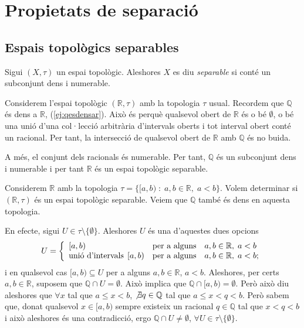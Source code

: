 \documentclass[../main.tex]{subfiles}
\begin{document}
\chapter{Propietats de separació}
\section{Espais topològics separables}

\begin{defi}
\label{def:espaitopologicseparable} Sigui $(X,\tau)$ un espai topològic. Aleshores $X$ es diu \textit{separable} si conté un subconjunt dens i numerable.
\end{defi}

\begin{ej}
\label{ej:separable1} Considerem l'espai topològic $(\mathbb{R},\tau)$ amb la topologia $\tau$ usual. Recordem que $\mathbb{Q}$ és dens a $\mathbb{R}$, (\ref{ej:qesdensar}). Això és perquè qualsevol obert de $\mathbb{R}$ és o bé $\emptyset$, o bé una unió d'una col·lecció arbitrària d'intervals oberts i tot interval obert conté un racional. Per tant, la intersecció de qualsevol obert de $\mathbb{R}$ amb $\mathbb{Q}$ és no buida.

A més, el conjunt dels racionals és numerable. Per tant, $\mathbb{Q}$ és un subconjunt dens i numerable i per tant $\mathbb{R}$ és un espai topològic separable.
\end{ej}

\begin{ej}
\label{ej:separable1} Considerem $\mathbb{R}$ amb la topologia $\tau = \{[a,b)\;:\;a,b\in\mathbb{R},\;a<b\}$. Volem determinar si $(\mathbb{R},\tau)$ és un espai topològic separable. Veiem que $\mathbb{Q}$ també és dens en aquesta topologia.

En efecte, sigui $U\in\tau\setminus\{\emptyset\}$. Aleshores $U$ és una d'aquestes dues opcions
\begin{equation}
    \notag
    U = \left\{
    \begin{array}{lcl}
        \left[a,b\right) & \text{per a alguns} & a,b\in\mathbb{R},\;a<b \\
        \text{unió d'intervals}\;\left[a,b\right) & \text{per a alguns} & a,b\in\mathbb{R},\;a<b;
    \end{array}
    \right.
\end{equation}
i en qualsevol cas $[a,b)\subseteq U$ per a alguns $a,b\in\mathbb{R}$, $a<b$. Aleshores, per certs $a,b\in\mathbb{R}$, suposem que $\mathbb{Q}\cap U=\emptyset$. Això implica que $\mathbb{Q}\cap [a,b) = \emptyset$. Però això diu aleshores que $\forall x$ tal que $a\leq x<b$, $\not\exists q\in\mathbb{Q}$ tal que $a\leq x<q<b$. Però sabem que, donat qualsevol $x\in [a,b)$ sempre existeix un racional $q\in\mathbb{Q}$ tal que $x<q<b$ i això aleshores és una contradicció, ergo $\mathbb{Q}\cap U\not=\emptyset$, $\forall U\in\tau\setminus\{\emptyset\}$.
\end{ej}
\end{document}
